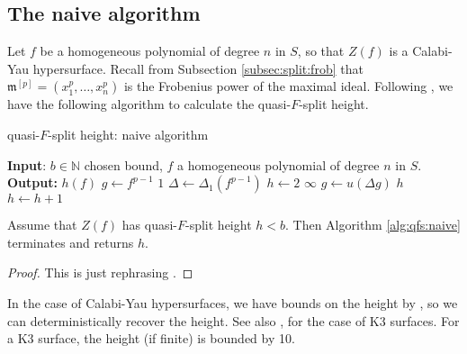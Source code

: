\subsection{The naive algorithm}

Let \(f\) be a homogeneous polynomial of degree \(n\) 
in \(S\), 
so that \(Z(f)\) is a Calabi-Yau hypersurface.
Recall from Subsection \ref{subsec:split:frob} that
\(\mathfrak{m}^{[p]} = (x_{1}^{p}, \ldots, x_{n}^{p})\)
is the Frobenius power of the maximal ideal.
Following \cite{kty-2022-fedder}, we have the following
algorithm to calculate the quasi-\(F\)-split height.

\begin{algorithm}[H]
\caption{quasi-\(F\)-split height: naive algorithm}
\label{alg:qfs:naive}
\begin{algorithmic}[1]
\State \textbf{Input}: \(b \in \mathbb{N}\) chosen bound, \(f\) a homogeneous
	polynomial of degree \(n\) in \(S\).
\State \textbf{Output:} $h(f)$
\State \(g \gets f^{p-1}\) 
    \State \Return \(1\) 
\EndIf
\State \(\Delta \gets \Delta_{1}(f^{p-1})\) 
\State \(h \gets 2\) 
        \State \Return \(\infty\)
    \EndIf
    \State \(g \gets u(\Delta g)\) 
        \State \Return \(h\) 
    \EndIf
    \State \(h \gets h + 1\)
\EndWhile
\end{algorithmic}
\end{algorithm}

\begin{thm}
	Assume that
	\(Z(f)\) has quasi-\(F\)-split height \(h < b\).
	Then Algorithm \ref{alg:qfs:naive} terminates
	and returns \(h\).
\end{thm}

\begin{proof}
	This is just rephrasing \cite[Theorem~C]{kty-2022-fedder}.
\end{proof}

In the case of Calabi-Yau hypersurfaces, we have bounds on the height by
\cite{van-der-geer-katsura-2003-calabi-yau},
so we can deterministically recover the height.  
See also \cite[Theorem~0.1]{artin-1974-k3-surfaces},
for the case of K3 surfaces.
For a K3 surface, the height (if finite) is bounded by 10.

